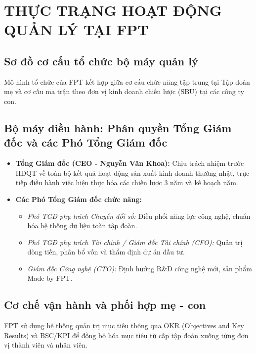 \section{THỰC TRẠNG HOẠT ĐỘNG QUẢN LÝ TẠI FPT}

\subsection{Sơ đồ cơ cấu tổ chức bộ máy quản lý}
Mô hình tổ chức của FPT kết hợp giữa cơ cấu chức năng tập trung tại Tập đoàn mẹ và cơ cấu ma trận theo đơn vị kinh doanh chiến lược (SBU) tại các công ty con.

\subsection{Bộ máy điều hành: Phân quyền Tổng Giám đốc và các Phó Tổng Giám đốc}
\begin{itemize}
    \item \textbf{Tổng Giám đốc (CEO - Nguyễn Văn Khoa):} Chịu trách nhiệm trước HĐQT về toàn bộ kết quả hoạt động sản xuất kinh doanh thường nhật, trực tiếp điều hành việc hiện thực hóa các chiến lược 3 năm và kế hoạch năm.
    \item \textbf{Các Phó Tổng Giám đốc chức năng:}
    \begin{itemize}
        \item \textit{Phó TGĐ phụ trách Chuyển đổi số:} Điều phối năng lực công nghệ, chuẩn hóa hệ thống dữ liệu toàn tập đoàn.
        \item \textit{Phó TGĐ phụ trách Tài chính / Giám đốc Tài chính (CFO):} Quản trị dòng tiền, phân bổ vốn và thẩm định dự án đầu tư.
        \item \textit{Giám đốc Công nghệ (CTO):} Định hướng R\&D công nghệ mới, sản phẩm Made by FPT.
    \end{itemize}
\end{itemize}

\subsection{Cơ chế vận hành và phối hợp mẹ - con}
FPT sử dụng hệ thống quản trị mục tiêu thông qua OKR (Objectives and Key Results) và BSC/KPI để đồng bộ hóa mục tiêu từ cấp tập đoàn xuống từng đơn vị thành viên và nhân viên.

